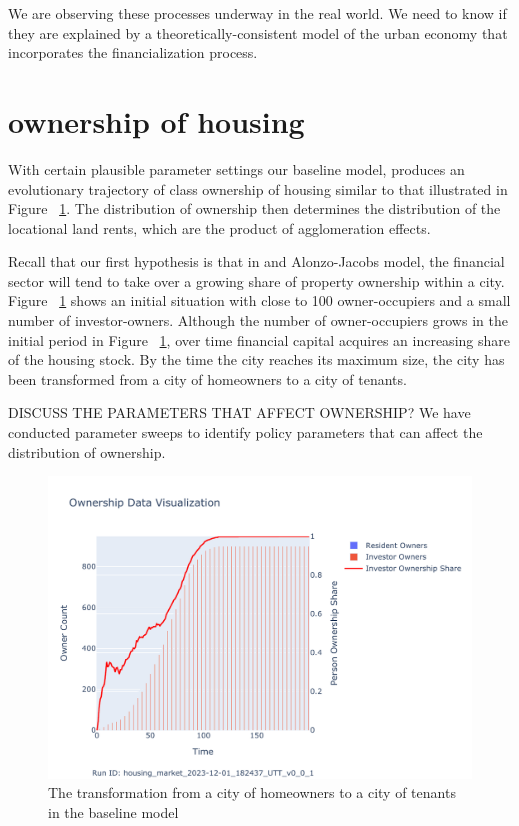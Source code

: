 
We are observing these processes underway in the real world. We need to know if they are explained by a theoretically-consistent model of the urban economy that incorporates the financialization process.

\section{ownership of housing}

With certain plausible parameter settings our baseline model, produces an evolutionary trajectory of class ownership of housing similar to that illustrated in Figure ~\ref{fig:Baseline_ownership_trajectory}. The distribution of ownership then determines the distribution of the locational land rents, which are the product of agglomeration effects. 

Recall that our first hypothesis is that in and \Gls{Alonzo-Jacobs model}, the financial sector will tend to take over a growing share of property ownership within a city. Figure ~\ref{fig:Baseline_ownership_trajectory} shows an initial situation with close to 100 owner-occupiers and a small number of investor-owners. Although the number of owner-occupiers grows in the initial period in Figure ~\ref{fig:Baseline_ownership_trajectory}, over time financial capital acquires an increasing share of the housing stock. By the time the city reaches its maximum size, the city has been transformed from a city of homeowners to a city of tenants.

DISCUSS THE PARAMETERS THAT AFFECT OWNERSHIP? We have conducted parameter sweeps to identify policy parameters that can affect the distribution of ownership.

\begin{figure}
    \centering
    \includegraphics[scale=.8, trim={0 1cm 0 1.8cm},clip]{fig/Analysis/Ownership_Data_1.pdf}
    \caption{The transformation from a city of homeowners to a city of tenants in the baseline model}
    \label{fig:Baseline_ownership_trajectory}
\end{figure}

